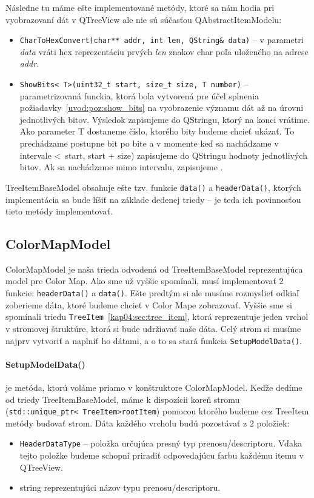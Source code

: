  Následne tu máme ešte implementované metódy, ktoré sa nám hodia pri vyobrazovaní dát v QTreeView ale nie sú súčasťou QAbstractItemModelu:
\begin{itemize}
\item \texttt{CharToHexConvert(char** addr, int len, QString\& data)} -- v parametri \textit{data} vráti hex reprezentáciu prvých \textit{len} znakov char poľa uloženého na adrese \textit{addr}.
\item \texttt{ShowBits\textless~T\textgreater(uint32\_t start, size\_t size, T number)}  -- parametrizovaná funckia, ktorá bola vytvorená pre účel splnenia požiadavky~\ref{uvod:poz:show_bits} na vyobrazenie významu dát až na úrovni jednotlivých bitov. Výsledok zapisujeme do QStringu, ktorý na konci vrátime. Ako parameter T dostaneme číslo, ktorého bity budeme chcieť ukázať. To prechádzame postupne bit po bite a v momente keď sa nachádzame v intervale \textless~start, start + size) zapisujeme do QStringu hodnoty jednotlivých bitov. Ak sa nachádzame mimo intervalu, zapisujeme .
\end{itemize}

TreeItemBaseModel obsahuje ešte tzv.  funkcie \texttt{data()} a \newline\texttt{headerData()}, ktorých implementácia sa bude líšiť na základe dedenej triedy -- je teda ich povinnosťou tieto metódy implementovať.


\subsection{ColorMapModel}
ColorMapModel je naša trieda odvodená od TreeItemBaseModel reprezentujúca model pre Color Map. Ako sme už vyššie spomínali, musí implementovať 2 funkcie: \texttt{headerData()} a \texttt{data()}. Ešte predtým si ale musíme rozmyslieť odkiaľ zoberieme dáta, ktoré budeme chcieť v Color Mape zobrazovať. Vyššie sme si spomínali triedu \texttt{TreeItem}~\ref{kap04:sec:tree_item}, ktorá reprezentuje jeden vrchol v stromovej štruktúre, ktorá si bude udržiavať naše dáta. Celý strom si musíme najprv vytvoriť a naplniť ho dátami, a o to sa stará funkcia \texttt{SetupModelData()}.

\paragraph{SetupModelData()} je metóda, ktorú voláme priamo v konštruktore ColorMapModel. Keďže dedíme od triedy TreeItemBaseModel, máme k dispozícii koreň stromu (\texttt{std::unique\_ptr\textless~TreeItem\textgreater rootItem}) pomocou ktorého budeme cez TreeItem metódy budovať strom. Dáta každého vrcholu budú pozostávať z 2 položiek:
\begin{itemize}
\item \texttt{HeaderDataType} -- položka určujúca presný typ prenosu/descriptoru. Vďa\-ka tejto položke budeme schopní priradiť odpovedajúcu farbu každému itemu v QTreeView.
\item string reprezentujúci názov typu prenosu/descriptoru.
\end{itemize}


